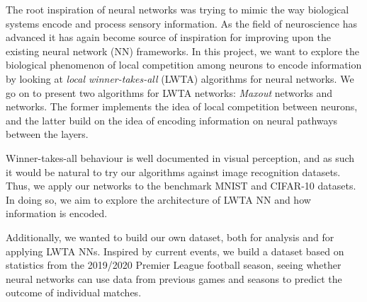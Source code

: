 The root inspiration of neural networks was trying to mimic the way biological systems encode and process sensory information. As the field of neuroscience has advanced it has again become source of inspiration for improving upon the existing neural network (NN) frameworks. In this project, we want to explore the biological phenomenon of local competition among neurons to encode information by looking at \textit{local winner-takes-all} (LWTA) algorithms for neural networks. We go on to present two algorithms for LWTA networks: \textit{Maxout} networks and  networks. The former implements the idea of local competition between neurons, and the latter build on the idea of encoding information on neural pathways between the layers.

Winner-takes-all behaviour is well documented in visual perception, and as such it would be natural to try our algorithms against image recognition datasets. Thus, we apply our networks to the benchmark MNIST and CIFAR-10 datasets. In doing so, we aim to explore the architecture of LWTA NN and how information is encoded.

Additionally, we wanted to build our own dataset, both for analysis and for applying LWTA NNs. Inspired by current events, we build a dataset based on statistics from the 2019/2020 Premier League football season, seeing whether neural networks can use data from previous games and seasons to predict the outcome of individual matches.
